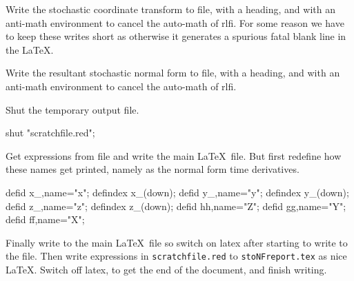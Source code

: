\documentclass[11pt,a5paper]{article}
\begin{document}
Write the stochastic coordinate transform to file, with a
heading, and with an anti-math environment to cancel the
auto-math of rlfi. For some reason we have to keep these
writes short as otherwise it generates a spurious fatal
blank line in the \LaTeX.

Write the resultant stochastic normal form to file, with a
heading, and with an anti-math environment to cancel the
auto-math of rlfi.

Shut the temporary output file.
\begin{reduce}
shut "scratchfile.red";
\end{reduce}

Get expressions from file and write the main \LaTeX\ file.
But first redefine how these names get printed, namely as
the normal form time derivatives. 
\begin{reduce}
defid x_,name="x"; defindex x_(down);
defid y_,name="y"; defindex y_(down);
defid z_,name="z"; defindex z_(down);
defid hh,name="\dot Z";
defid gg,name="\dot Y";
defid ff,name="\dot X";
\end{reduce}

Finally write to the main \LaTeX\ file so switch on latex
after starting to write to the file. Then write expressions
in \verb|scratchfile.red| to \verb|stoNFreport.tex| as nice
\LaTeX. Switch off latex, to get the end of the document,
and finish writing.
\end{document}
